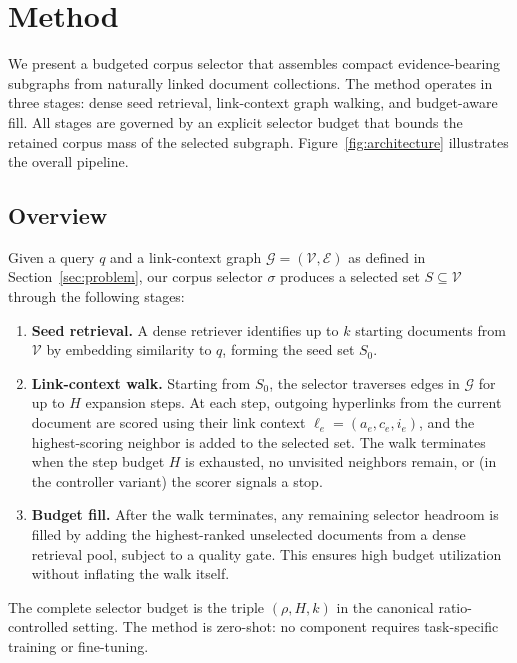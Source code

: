 \section{Method}
\label{sec:method}

We present a budgeted corpus selector that assembles compact evidence-bearing subgraphs from naturally linked document collections. The method operates in three stages: dense seed retrieval, link-context graph walking, and budget-aware fill. All stages are governed by an explicit selector budget that bounds the retained corpus mass of the selected subgraph. Figure~\ref{fig:architecture} illustrates the overall pipeline.

\subsection{Overview}
\label{sec:method:overview}

Given a query $q$ and a link-context graph $\mathcal{G} = (\mathcal{V}, \mathcal{E})$ as defined in Section~\ref{sec:problem}, our corpus selector $\sigma$ produces a selected set $S \subseteq \mathcal{V}$ through the following stages:

\begin{enumerate}[leftmargin=*,nosep]
\item \textbf{Seed retrieval.} A dense retriever identifies up to $k$ starting documents from $\mathcal{V}$ by embedding similarity to $q$, forming the seed set $S_0$.

\item \textbf{Link-context walk.} Starting from $S_0$, the selector traverses edges in $\mathcal{G}$ for up to $H$ expansion steps. At each step, outgoing hyperlinks from the current document are scored using their link context $\ell_e = (a_e, c_e, i_e)$, and the highest-scoring neighbor is added to the selected set. The walk terminates when the step budget $H$ is exhausted, no unvisited neighbors remain, or (in the controller variant) the scorer signals a stop.

\item \textbf{Budget fill.} After the walk terminates, any remaining selector headroom is filled by adding the highest-ranked unselected documents from a dense retrieval pool, subject to a quality gate. This ensures high budget utilization without inflating the walk itself.
\end{enumerate}

The complete selector budget is the triple $(\rho, H, k)$ in the canonical ratio-controlled setting. The method is zero-shot: no component requires task-specific training or fine-tuning.

